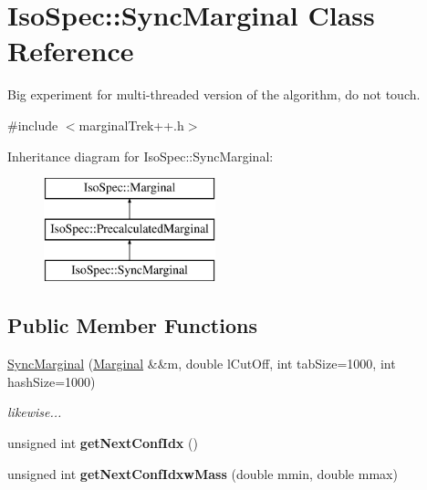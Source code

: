 \hypertarget{class_iso_spec_1_1_sync_marginal}{}\section{Iso\+Spec\+:\+:Sync\+Marginal Class Reference}
\label{class_iso_spec_1_1_sync_marginal}


Big experiment for multi-\/threaded version of the algorithm, do not touch.  




{\ttfamily \#include $<$marginal\+Trek++.\+h$>$}

Inheritance diagram for Iso\+Spec\+:\+:Sync\+Marginal\+:\begin{figure}[H]
\begin{center}
\leavevmode
\includegraphics[height=3.000000cm]{class_iso_spec_1_1_sync_marginal}
\end{center}
\end{figure}
\subsection*{Public Member Functions}
\begin{DoxyCompactItemize}
\item 
\mbox{\label{class_iso_spec_1_1_sync_marginal_a81bb7f17ae1f2618813cf02e4d2b2f8c}} 
\mbox{\hyperlink{class_iso_spec_1_1_sync_marginal_a81bb7f17ae1f2618813cf02e4d2b2f8c}{Sync\+Marginal}} (\mbox{\hyperlink{class_iso_spec_1_1_marginal}{Marginal}} \&\&m, double l\+Cut\+Off, int tab\+Size=1000, int hash\+Size=1000)
\begin{DoxyCompactList}\small\item\em likewise... \end{DoxyCompactList}\item 
\mbox{\label{class_iso_spec_1_1_sync_marginal_a2029b97d45da908ab2ee9a1a0d72cbd3}} 
unsigned int {\bfseries get\+Next\+Conf\+Idx} ()
\item 
\mbox{\label{class_iso_spec_1_1_sync_marginal_ad52b7503991e3378cb5f645e6a45b665}} 
unsigned int {\bfseries get\+Next\+Conf\+Idxw\+Mass} (double mmin, double mmax)
\end{DoxyCompactItemize}
